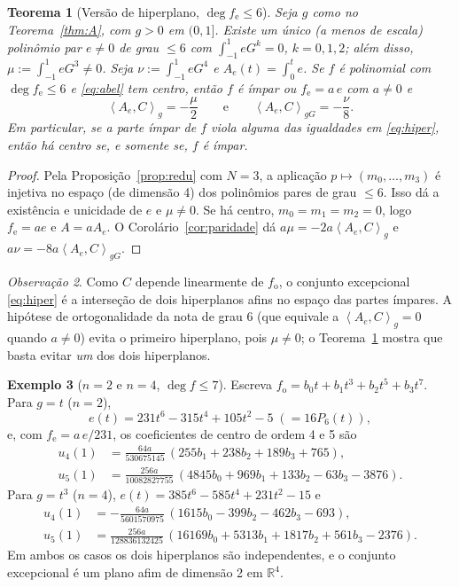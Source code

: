 \documentclass[11pt]{article}
\theoremstyle{plain}
\newtheorem{theorem}{Teorema}[section]
\theoremstyle{definition}
\newtheorem{example}[theorem]{Exemplo}
\theoremstyle{remark}
\newtheorem{remark}[theorem]{Observação}
\newcommand{\R}{\mathbb{R}}
\newcommand{\fe}{f_{\mathrm e}}
\newcommand{\fo}{f_{\mathrm o}}
\newcommand{\ip}[2]{\left\langle #1,#2\right\rangle}
\begin{document}
\begin{theorem}[Versão de hiperplano, $\deg\fe\le6$]\label{thm:B}
Seja $g$ como no Teorema~\ref{thm:A}, com $g>0$ em $(0,1]$. Existe um único (a
menos de escala) polinômio par $e\neq0$ de grau $\le6$ com
$\int_{-1}^1eG^k=0$, $k=0,1,2$; além disso,
$\mu:=\int_{-1}^1eG^3\neq0$. Seja $\nu:=\int_{-1}^1eG^4$ e $A_e(t)=\int_0^te$.
Se $f$ é polinomial com $\deg\fe\le6$ e \eqref{eq:abel} tem centro, então $f$ é
ímpar ou $\fe=a\,e$ com $a\ne0$ e
\begin{equation}\label{eq:hiper}
 \ip{A_e}{C}_g=-\frac{\mu}{2}
 \qquad\text{e}\qquad
 \ip{A_e}{C}_{gG}=-\frac{\nu}{8}.
\end{equation}
Em particular, se a parte ímpar de $f$ viola alguma das igualdades em
\eqref{eq:hiper}, então há centro se, e somente se, $f$ é ímpar.
\end{theorem}

\begin{proof}
Pela Proposição~\ref{prop:redu} com $N=3$, a aplicação
$p\mapsto(m_0,\dots,m_3)$ é injetiva no espaço (de dimensão 4) dos polinômios
pares de grau $\le6$. Isso dá a existência e unicidade de $e$ e $\mu\ne0$. Se há
centro, $m_0=m_1=m_2=0$, logo $\fe=ae$ e $A=aA_e$. O Corolário~\ref{cor:paridade}
dá $a\mu=-2a\ip{A_e}{C}_g$ e $a\nu=-8a\ip{A_e}{C}_{gG}$.
\end{proof}

\begin{remark}
Como $C$ depende linearmente de $\fo$, o conjunto excepcional \eqref{eq:hiper} é
a interseção de dois hiperplanos afins no espaço das partes ímpares. A hipótese
de ortogonalidade da nota de grau 6 (que equivale a $\ip{A_e}{C}_g=0$ quando
$a\ne0$) evita o primeiro hiperplano, pois $\mu\ne0$; o Teorema~\ref{thm:B}
mostra que basta evitar \emph{um} dos dois hiperplanos.
\end{remark}

\begin{example}[$n=2$ e $n=4$, $\deg f\le7$]\label{ex:hiper}
Escreva $\fo=b_0t+b_1t^3+b_2t^5+b_3t^7$. Para $g=t$ ($n=2$),
\[
 e(t)=231t^6-315t^4+105t^2-5\;(=16P_6(t)),
\]
e, com $\fe=a\,e/231$, os coeficientes de centro de ordem 4 e 5 são
\begin{align*}
 u_4(1)&=\tfrac{64a}{530675145}\,(255b_1+238b_2+189b_3+765),\\
 u_5(1)&=\tfrac{256a}{10082827755}\,(4845b_0+969b_1+133b_2-63b_3-3876).
\end{align*}
Para $g=t^3$ ($n=4$), $e(t)=385t^6-585t^4+231t^2-15$ e
\begin{align*}
 u_4(1)&=-\tfrac{64a}{5601570975}\,(1615b_0-399b_2-462b_3-693),\\
 u_5(1)&=\tfrac{256a}{128836132425}\,(16169b_0+5313b_1+1817b_2+561b_3-2376).
\end{align*}
Em ambos os casos os dois hiperplanos são independentes, e o conjunto
excepcional é um plano afim de dimensão 2 em $\R^4$.
\end{example}
\end{document}

